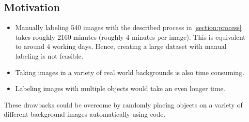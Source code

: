\documentclass[paper=a4,11pt,parskip=half,toc=listof]{scrartcl}
\begin{document}
\subsection{Motivation}
	\begin{itemize}
		\item Manually labeling 540 images with the described process in \ref{section:process} takes roughly 2160 minutes (roughly 4 minutes per image). This is equivalent to around 4 working days. Hence, creating a large dataset with manual labeling is not feasible.
		\item Taking images in a variety of real world backgrounds is also time consuming.
		\item Labeling images with multiple objects would take an even longer time.
	\end{itemize}
	
These drawbacks could be overcome by randomly placing objects on a variety of different background images automatically using code.
\end{document}
